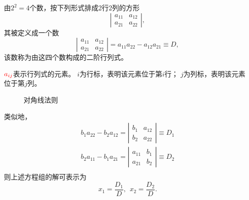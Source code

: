 \documentclass[10pt,a4paper%
tablecaptionabove]{article}
\newcommand{\red}{\textcolor{red}}
\begin{document}
\begin{CJK}{UTF8}{gkai}
  \begin{dingyi}[二阶行列式]
    由$2^2=4$个数，按下列形式排成2行2列的方形
    $$
    \left|
      \begin{array}{cc}
        a_{11} & a_{12} \\[0.2cm]
        a_{21} & a_{22} 
      \end{array}
    \right|,
    $$
    其被定义成一个数
    $$
    \left|
      \begin{array}{cc}
        a_{11} & a_{12} \\[0.2cm]
        a_{21} & a_{22} 
      \end{array}
    \right| = a_{11}a_{22} - a_{12}a_{21} \equiv D,
    $$
    该数称为由这四个数构成的二阶行列式。
  \end{dingyi}
  $\red{a_{ij}}$表示行列式的元素。
  $i$为行标，表明该元素位于第$i$行；
  $j$为列标，表明该元素位于第$j$列。
  \begin{figure}[htbp]
    \centering      
    \caption{对角线法则}
  \end{figure}

  
  类似地，
  $$
  \begin{array}{l}
    b_1 a_{22} - b_2 a_{12} = \left|
    \begin{array}{cc}
      b_1 & a_{12} \\
      b_2 & a_{22} 
    \end{array}
            \right|  \equiv D_1\\[0.4cm]
    b_2 a_{11} - b_1 a_{21} = \left|
    \begin{array}{cc}
      a_{11} & b_1 \\
      a_{21} & b_2
    \end{array}
               \right|  \equiv D_2\\
  \end{array}
  $$      
  则上述方程组的解可表示为
  $$
  x_1 = \frac{D_1}{D},\ \
  x_2 = \frac{D_2}{D}.
  $$


\end{CJK}
\end{document}
